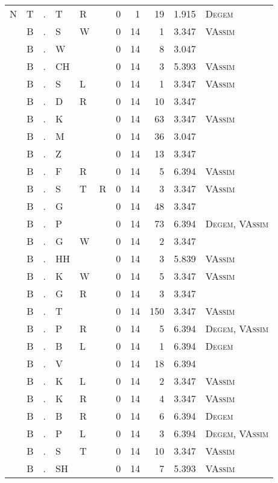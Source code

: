 \begin{longtable}{r@{ } r@{ } c@{ } l@{ } l@{ } l@{ } r r r r l }
N & T & . & T & R &  & 0 & 1 & 19 & 1.915 & \textsc{Degem} \\
 & B & . & S & W &  & 0 & 14 & 1 & 3.347 & \textsc{VAssim} \\
 & B & . & W &  &  & 0 & 14 & 8 & 3.047 &  \\
 & B & . & CH &  &  & 0 & 14 & 3 & 5.393 & \textsc{VAssim} \\
 & B & . & S & L &  & 0 & 14 & 1 & 3.347 & \textsc{VAssim} \\
 & B & . & D & R &  & 0 & 14 & 10 & 3.347 &  \\
 & B & . & K &  &  & 0 & 14 & 63 & 3.347 & \textsc{VAssim} \\
 & B & . & M &  &  & 0 & 14 & 36 & 3.047 &  \\
 & B & . & Z &  &  & 0 & 14 & 13 & 3.347 &  \\
 & B & . & F & R &  & 0 & 14 & 5 & 6.394 & \textsc{VAssim} \\
 & B & . & S & T & R & 0 & 14 & 3 & 3.347 & \textsc{VAssim} \\
 & B & . & G &  &  & 0 & 14 & 48 & 3.347 &  \\
 & B & . & P &  &  & 0 & 14 & 73 & 6.394 & \textsc{Degem}, \textsc{VAssim} \\
 & B & . & G & W &  & 0 & 14 & 2 & 3.347 &  \\
 & B & . & HH &  &  & 0 & 14 & 3 & 5.839 & \textsc{VAssim} \\
 & B & . & K & W &  & 0 & 14 & 5 & 3.347 & \textsc{VAssim} \\
 & B & . & G & R &  & 0 & 14 & 3 & 3.347 &  \\
 & B & . & T &  &  & 0 & 14 & 150 & 3.347 & \textsc{VAssim} \\
 & B & . & P & R &  & 0 & 14 & 5 & 6.394 & \textsc{Degem}, \textsc{VAssim} \\
 & B & . & B & L &  & 0 & 14 & 1 & 6.394 & \textsc{Degem} \\
 & B & . & V &  &  & 0 & 14 & 18 & 6.394 &  \\
 & B & . & K & L &  & 0 & 14 & 2 & 3.347 & \textsc{VAssim} \\
 & B & . & K & R &  & 0 & 14 & 4 & 3.347 & \textsc{VAssim} \\
 & B & . & B & R &  & 0 & 14 & 6 & 6.394 & \textsc{Degem} \\
 & B & . & P & L &  & 0 & 14 & 3 & 6.394 & \textsc{Degem}, \textsc{VAssim} \\
 & B & . & S & T &  & 0 & 14 & 10 & 3.347 & \textsc{VAssim} \\
 & B & . & SH &  &  & 0 & 14 & 7 & 5.393 & \textsc{VAssim} \\

\end{longtable}
